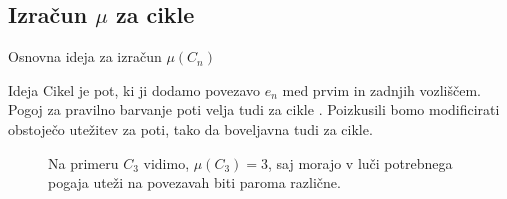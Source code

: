 \documentclass{beamer}
\begin{document}
\subsection{Izračun $\mu$ za cikle}
\begin{frame}{Osnovna ideja za izračun $\mu(C_n)$}
	\begin{block}{Ideja}
		Cikel je pot, ki ji dodamo povezavo $e_n$ med prvim in zadnjih vozliščem. Pogoj za pravilno barvanje poti velja tudi za cikle . Poizkusili bomo modificirati obstoječo utežitev za poti, tako da boveljavna tudi za cikle.
	\end{block}

\begin{figure}
	\caption{Na primeru $C_3$ vidimo, $\mu(C_3) = 3$, saj morajo v luči potrebnega pogaja uteži na povezavah biti paroma različne.}
\end{figure}
\end{frame}
\end{document}
